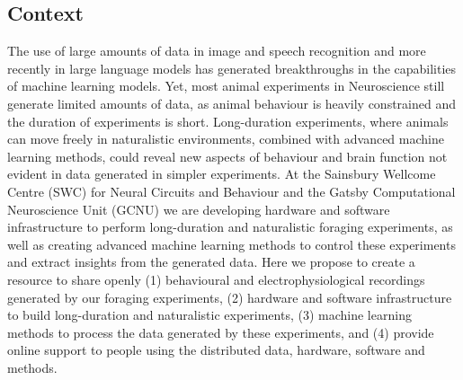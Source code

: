 \subsection{Context}

The use of large amounts of data in image and speech recognition and more
recently in large language models has generated breakthroughs in the
capabilities of machine learning models. Yet, most animal experiments in
Neuroscience still generate limited amounts of data, as animal behaviour is
heavily constrained and the duration of experiments is short.
%
Long-duration experiments, where animals can move freely in naturalistic
environments, combined with advanced machine learning methods, could reveal new
aspects of behaviour and brain function not evident in data generated in simpler
experiments.
%
At the Sainsbury Wellcome Centre (SWC) for Neural Circuits and Behaviour and the
Gatsby Computational Neuroscience Unit (GCNU) we are developing hardware and
software infrastructure to perform long-duration and naturalistic foraging
experiments, as well as creating advanced machine learning methods to control
these experiments and extract insights from the generated data.
%
Here we propose to create a resource to share openly (1) behavioural and
electrophysiological recordings generated by our foraging experiments, (2)
hardware and software infrastructure to build long-duration and naturalistic
experiments, (3) machine learning methods to process the data generated by
these experiments, and (4) provide online support to people using the
distributed data, hardware, software and methods.

%
% 
%

%

